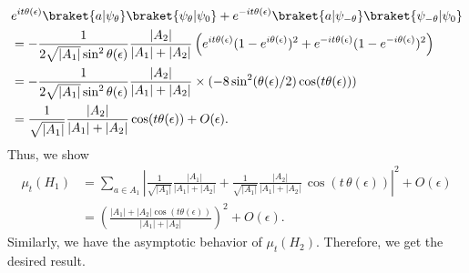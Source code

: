 \documentclass[12pt]{article}
\numberwithin{lemma}{section}
\numberwithin{proposition}{section}
\numberwithin{remark}{section}
\numberwithin{definition}{section}
\begin{document}
\begin{align*}
    &e^{it\theta(\epsilon)}\braket{a|\psi_{\theta}} \braket{\psi_{\theta}|\psi_0} +e^{-it\theta(\epsilon)}\braket{a|\psi_{-\theta}}\braket{\psi_{-\theta}|\psi_0} \\
    &=-\frac{1}{2\sqrt{|A_1|} \sin^2 \theta(\epsilon)}\frac{|A_2|}{|A_1|+|A_2|} \left(e^{it \theta(\epsilon)}(1-e^{i \theta(\epsilon)})^2+e^{-it \theta(\epsilon)}(1-e^{-i \theta(\epsilon)})^2\right) \\
    &=-\frac{1}{2\sqrt{|A_1|} \sin^2 \theta(\epsilon)}\frac{|A_2|}{|A_1|+|A_2|}\times (-8 \sin^2 (\theta(\epsilon)/2)\cos(t\theta(\epsilon))) \\
    &= \frac{1}{\sqrt{|A_1|}}\frac{|A_2|}{|A_1|+|A_2|}\cos(t \theta(\epsilon))+O(\epsilon).
\end{align*}
Thus, we show
\begin{align*}
    \mu_{t}(H_1)&=\sum_{a \in A_1}\left|\frac{1}{\sqrt{|A_1|}}\frac{|A_1|}{|A_1|+|A_2|}+\frac{1}{\sqrt{|A_1|}}\frac{|A_2|}{|A_1|+|A_2|}\, \cos(t\,\theta(\epsilon))\right|^2+O(\epsilon) \\
    &=\left(\frac{|A_1|+|A_2|\cos (t \theta(\epsilon))}{|A_1|+|A_2|}\right)^2+O(\epsilon).
\end{align*}
Similarly, we have the asymptotic behavior of $\mu_t(H_2)$.
Therefore, we get the desired result.
\end{document}
